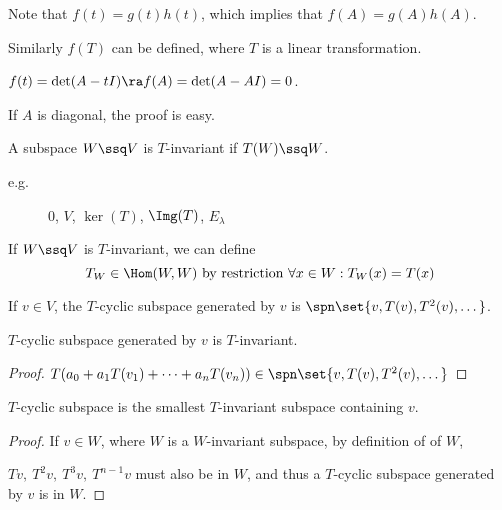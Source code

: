 \documentclass[11pt]{scrartcl}
\begin{document}
\begin{remark}
Note that $f(t) = g(t)h(t)$, which implies that $f(A) = g(A)h(A)$.
\end{remark}
\begin{remark}
Similarly $f(T)$ can be defined, where $T$ is a linear transformation.
\end{remark}
\begin{example}
$f(t) = \det(A-tI) \ra f(A) = \det(A-AI) = 0$.
\end{example}
\begin{remark}
If $A$ is diagonal, the proof is easy.
\end{remark}
\begin{definition}
A subspace $W\ssq V$ is $T$-invariant if $T(W) \ssq W$.
\end{definition}
\begin{description}
\item[e.g.] ${0}$, $V$, $\ker(T)$, $\Img(T)$, $E_{\lambda}$
\end{description}

If $W\ssq V$ is $T$-invariant, we can define
\begin{equation*}
T_{W}\in \Hom(W, W) \text{ by restriction $\forall x \in W: T_{W}(x) = T(x)$}
\end{equation*}
\begin{definition}
  If $v\in V$, the $T$-cyclic subspace generated by $v$ is
  $\spn\set{v, T(v), T^{2}(v), \dots}$.
\end{definition}

\begin{claim*}
  $T$-cyclic subspace generated by $v$ is $T$-invariant.
\end{claim*}
\begin{proof}
  $T(a_{0}+ a_{1}T(v_1) +\cdots + a_nT(v_n))\in\spn\set{v, T(v), T^{2}(v), \dots}$
\end{proof}
\begin{claim*}
  $T$-cyclic subspace is the smallest $T$-invariant subspace containing $v$.
\end{claim*}
\begin{proof}
  If $v\in W$, where $W$ is a $W$-invariant subspace, by definition of
  of $W$,

  $Tv,\ T^{2}v,\ T^3v,\ T^{n-1}v$ must also be in $W$, and thus a $T$-cyclic
  subspace generated by $v$ is in $W$.
\end{proof}
\end{document}
